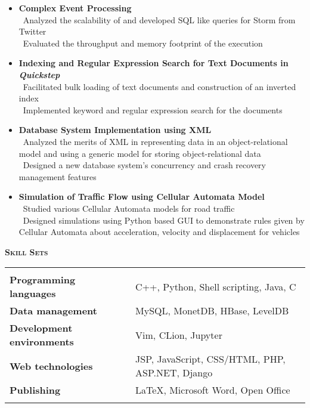 \documentclass[11pt]{article}
\newcommand{\graybox}[1]{\begin{mdframed}[backgroundcolor=light-gray, linecolor=light-gray, roundcorner=10pt, shadow=false, shadowsize=1pt]
\Large{\textbf{\textsc{#1}}}
\end{mdframed}}
\begin{document}
\begin{itemize}\addtolength{\itemsep}{-0.5\baselineskip}%
\item{\textbf{Complex Event Processing}}\\
	\textendash\ Analyzed the scalability of and developed SQL like queries for Storm from Twitter\\
	\textendash\ Evaluated the throughput and memory footprint of the execution\\
\item{\textbf{Indexing and Regular Expression Search for Text Documents in \textit{Quickstep}}}\\
	\textendash\ Facilitated bulk loading of text documents and construction of an inverted index\\
	\textendash\ Implemented keyword and regular expression search for the documents\\%
\item{\textbf{Database System Implementation using XML}}\\
	\textendash\ Analyzed the merits of XML in representing data in an object-relational model and using a generic model for storing object-relational data\\
	\textendash\ Designed a new database system's concurrency and crash recovery management features\\
	\item{\textbf{Simulation of Traffic Flow using Cellular Automata Model}}\\
	\textendash\ Studied various Cellular Automata models for road traffic\\
	\textendash\ Designed simulations using Python based GUI to demonstrate rules given by Cellular Automata about acceleration, velocity and displacement for vehicles\\
\end{itemize}
\graybox{Skill Sets}
\begin{tabular}{l  c  l}
 & \\
\textbf{Programming languages} & & \quad C++, Python, Shell scripting, Java, C\\
\textbf{Data management} & & \quad MySQL, MonetDB, HBase, LevelDB\\
\textbf{Development environments} & & \quad Vim, CLion, Jupyter\\
\textbf{Web technologies} & & \quad JSP, JavaScript, CSS/HTML, PHP, ASP.NET, Django\\
\textbf{Publishing} & & \quad \LaTeX, Microsoft Word, Open Office\\ \\
\end{tabular}
\end{document}

